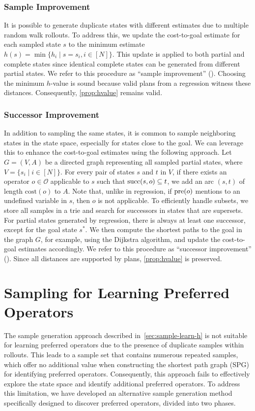 \documentclass[ppgc,diss,english]{iiufrgs}
\begin{document}
\subsubsection{Sample Improvement}
\label{sec:sample-sai}
It is possible to generate duplicate states with different estimates due to multiple random walk rollouts. To address this, we update the cost-to-goal estimate for each sampled state $s$ to the minimum estimate $h(s) = \min\{h_i \mid s=s_i, i\in[N]\}$. This update is applied to both partial and complete states since identical complete states can be generated from different partial states. We refer to this procedure as ``sample improvement'' (\sai). Choosing the minimum $h$-value is sound because valid plans from a regression witness these distances. Consequently, \cref{prop:hvalue} remains valid.

\subsubsection{Successor Improvement}
\label{sec:sample-sui}
In addition to sampling the same states, it is common to sample neighboring states in the state space, especially for states close to the goal. We can leverage this to enhance the cost-to-goal estimates using the following approach. Let $G=(V,A)$ be a directed graph representing all sampled partial states, where~$V=\{s_i\mid i\in[N]\}$. For every pair of states $s$ and $t$ in $V$, if there exists an operator $o\in\mathcal{O}$ applicable to $s$ such that $\operatorname{succ}(s,o)\subseteq t$, we add an arc $(s,t)$ of length $\text{cost}(o)$ to $A$. Note that, unlike in regression, if $\operatorname{pre}(o)$ mentions to an undefined variable in $s$, then $o$ is not applicable. To efficiently handle subsets, we store all samples in a trie and search for successors in states that are supersets. For partial states generated by regression, there is always at least one successor, except for the goal state $s^*$. We then compute the shortest paths to the goal in the graph $G$, for example, using the Dijkstra algorithm, and update the cost-to-goal estimates accordingly. We refer to this procedure as ``successor improvement'' (\sui). Since all distances are supported by plans, \cref{prop:hvalue} is preserved.

\section{Sampling for Learning Preferred Operators}
\label{sec:sample-learn-po}
The sample generation approach described in~\cref{sec:sample-learn-h} is not suitable for learning preferred operators due to the presence of duplicate samples within rollouts. This leads to a sample set that contains numerous repeated samples, which offer no additional value when constructing the shortest path graph (SPG) for identifying preferred operators. Consequently, this approach fails to effectively explore the state space and identify additional preferred operators. To address this limitation, we have developed an alternative sample generation method specifically designed to discover preferred operators, divided into two phases.
\end{document}
